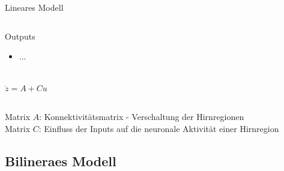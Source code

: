 \documentclass{beamer}
\begin{document}
\begin{frame}{Lineares Modell}
\begin{columns}
\begin{center}
{\begin{minipage}{\textwidth}
\begin{block}{Outputs}
\begin{itemize}
						\item ...
						\end{itemize}
					\end{block}
					\end{minipage}
				}\\
				\vspace{0.5cm}
				$\dot{z}=A+Cu$ 
			\end{center}
		\end{columns}	
		\vspace{0.5cm}
		{\small Matrix $A$: Konnektivitätsmatrix - Verschaltung der Hirnregionen} \\
		{\small Matrix $C$: Einfluss der Inputs auf die neuronale Aktivität einer Hirnregion}
	\end{frame}
	
\subsection{Bilineraes Modell}
\end{document}
